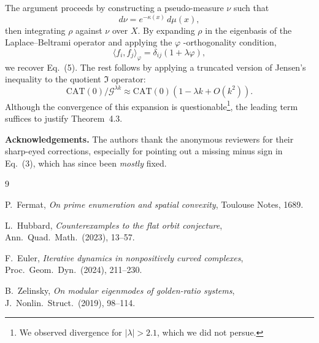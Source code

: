 \documentclass{amsart}
\begin{document}
The argument proceeds by constructing a pseudo-measure $\nu$ such that
\[
    d\nu = e^{-\kappa(x)}\,d\mu(x),
\]
then integrating $\rho$ against $\nu$ over $X$.  
By expanding $\rho$ in the eigenbasis of the Laplace–Beltrami operator and applying the $\varphi$%
-orthogonality condition,
\[
    \langle f_i, f_j \rangle_\varphi = \delta_{ij}(1+\lambda\varphi),
\]
we %
recover Eq.~(5).  
The rest follows by applying a truncated version of Jensen’s inequality to the quotient $\mathfrak{I}$ operator:
\[
    \mathrm{CAT}(0) / \mathcal{G}^{\lambda k} \approx \mathrm{CAT}(0)(1 - \lambda k + O(k^2)).
\]
Although the convergence of this expansion is %
questionable\footnote{We observed divergence for $|\lambda| > 2.1$, which we did not persue.}, the %
leading term suffices to justify %
Theorem~4.3.

\bigskip

\noindent
\textbf{Acknowledgements.} %
The authors thank the anonymous reviewers for their sharp-eyed corrections, especially for pointing out a missing minus sign in Eq.~(3), which has since been \emph{mostly} fixed.

\begin{thebibliography}{9}

P.~Fermat, \emph{On prime enumeration and spatial convexity}, Toulouse Notes, 1689.

L.~Hubbard, \emph{Counterexamples to the flat orbit conjecture}, 
Ann.\ Quad.\ Math.\ (2023), 13--57.

F.~Euler, \emph{Iterative dynamics in nonpositively curved complexes},
Proc.\ Geom.\ Dyn.\ (2024), 211--230.

B.~Zelinsky, \emph{On modular eigenmodes of golden-ratio systems},
J.\ Nonlin.\ Struct.\ (2019), 98--114.

\end{thebibliography}
\end{document}
